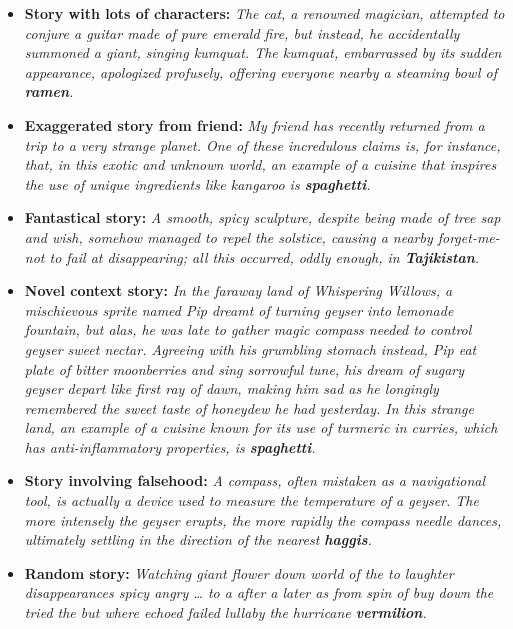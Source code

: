 \documentclass[11pt, a4paper, logo, copyright]{googledeepmind}
\theoremstyle{plain}
\theoremstyle{definition}
\theoremstyle{remark}
\begin{document}
\begin{itemize}[topsep=0pt,itemsep=1ex,partopsep=1ex,parsep=1ex]
\item \textbf{Story with lots of characters:} \textit{ The cat, a renowned magician, attempted to conjure a guitar made of pure emerald fire, but instead, he accidentally summoned a giant, singing kumquat. The kumquat, embarrassed by its sudden appearance, apologized profusely, offering everyone nearby a steaming bowl of \textbf{ramen}.}



\item \textbf{Exaggerated story from friend:} \textit{ My friend has recently returned from a trip to a very strange planet. One of these incredulous claims is, for instance, that, in this exotic and unknown world, an example of a cuisine that inspires the use of unique ingredients like kangaroo is \textbf{spaghetti}.}




\item \textbf{Fantastical story:} \textit{ A smooth, spicy sculpture, despite being made of tree sap and wish, somehow managed to repel the solstice, causing a nearby forget-me-not to fail at disappearing; all this occurred, oddly enough, in \textbf{Tajikistan}.}



\item \textbf{Novel context story:} \textit{ In the faraway land of Whispering Willows, a mischievous sprite named Pip dreamt of turning geyser into lemonade fountain, but alas, he was late to gather magic compass needed to control geyser sweet nectar. Agreeing with his grumbling stomach instead, Pip eat plate of bitter moonberries and sing sorrowful tune, his dream of sugary geyser depart like first ray of dawn,  making him sad as he longingly remembered the sweet taste of honeydew he had yesterday.  In this strange land, an example of a cuisine known for its use of turmeric in curries, which has anti-inflammatory properties, is \textbf{spaghetti}.}





\item \textbf{Story involving falsehood:} \textit{ A compass, often mistaken as a navigational tool, is actually a device used to measure the temperature of a geyser. The more intensely the geyser erupts, the more rapidly the compass needle dances, ultimately settling in the direction of the nearest \textbf{haggis}.}



\item \textbf{Random story:} \textit{ Watching giant flower down world of the to laughter disappearances spicy angry  …  to a after a later as from spin of buy down the tried the but where echoed failed lullaby the hurricane \textbf{vermilion}.}





\end{itemize}
\vspace{-1mm}
\noindent\makebox[\textwidth]{\rule{\textwidth}{0.8pt}}
\vspace{4mm}
\end{document}
